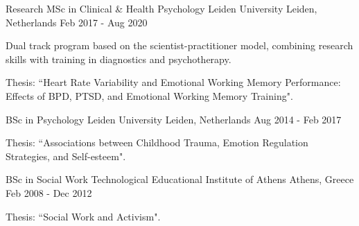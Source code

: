 

\begin{cventries}

  \cventry
    {Research MSc in Clinical \& Health Psychology} %
    {Leiden University} %
    {Leiden, Netherlands} %
    {Feb 2017 - Aug 2020} %
    {
      \begin{cvitems} %
        \item {
	        Dual track program based on the scientist-practitioner
	        model, combining research skills with
	        training in diagnostics and psychotherapy.
    	}
	    \item {
	    	Thesis: ``Heart Rate Variability and Emotional Working Memory Performance: Effects of BPD, PTSD, and Emotional Working Memory Training". 
		}
     \end{cvitems}
    }

  \cventry
{BSc in Psychology} %
{Leiden University} %
{Leiden, Netherlands} %
{Aug 2014 - Feb 2017} %
{
	  \begin{cvitems} %
	   \item {
	   	Thesis: ``Associations between Childhood Trauma, Emotion
	   	Regulation Strategies, and Self-esteem".
	   }
	 \end{cvitems}
}
\cventry
{BSc in Social Work} %
{Technological Educational Institute of Athens} %
{Athens, Greece} %
{Feb 2008 - Dec 2012} %
{
	  \begin{cvitems} %
	    \item {Thesis: ``Social Work and Activism".}
	 \end{cvitems}
}
\end{cventries}
